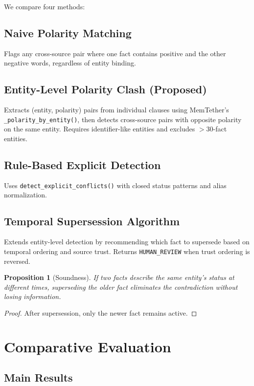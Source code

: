 \documentclass{article}
\newtheorem{proposition}{Proposition}
\begin{document}
We compare four methods:

\subsection{Naive Polarity Matching}
Flags any cross-source pair where one fact contains positive and the other negative words, regardless of entity binding.

\subsection{Entity-Level Polarity Clash (Proposed)}
Extracts (entity, polarity) pairs from individual clauses using MemTether's \texttt{\_polarity\_by\_entity()}, then detects cross-source pairs with opposite polarity on the same entity. Requires identifier-like entities and excludes $>30$-fact entities.

\subsection{Rule-Based Explicit Detection}
Uses \texttt{detect\_explicit\_conflicts()} with closed status patterns and alias normalization.

\subsection{Temporal Supersession Algorithm}
Extends entity-level detection by recommending which fact to supersede based on temporal ordering and source trust. Returns \texttt{HUMAN\_REVIEW} when trust ordering is reversed.

\begin{proposition}[Soundness]
If two facts describe the same entity's status at different times, superseding the older fact eliminates the contradiction without losing information.
\end{proposition}

\begin{proof}
After supersession, only the newer fact remains active.
\end{proof}


\section{Comparative Evaluation}
\label{sec:eval}

\subsection{Main Results}
\end{document}
